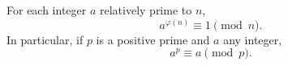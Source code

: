 For each integer $a$ relatively prime to $n$,
$$a^{\varphi(n)} \equiv 1 \pmod{n}.$$
In particular, if $p$ is a positive prime and $a$ any integer,
$$a^p \equiv a \pmod{p}.$$
